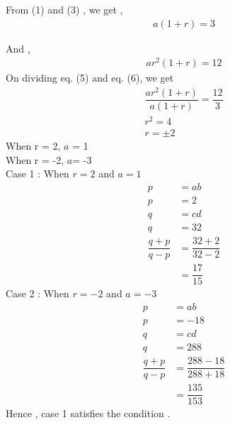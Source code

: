\documentclass[journal,12pt,twocolumn]{IEEEtran}
\theoremstyle{remark}
\begin{document}
From (1) and (3) , we get , 
\begin{align}
a(1+r)=3
\end{align}
 
 And ,
 \begin{align}
ar^{2}(1+r) = 12
\end{align}
On dividing eq. (5) and eq. (6), we get
\begin{align}
\dfrac{ar^{2}(1+r)}{a(1+r)} = \dfrac{12}{3} \\
r^{2} = 4 \\
r = \pm2
\end{align}
When r = 2, $a$ = 1 \\
When r = -2, $a$= -3 \\
Case 1 :
When $r = 2$ and $a = 1$ \\
\begin{align}
p &= ab\\
p&=2 \\
q&= cd \\
q&=32 \\
\dfrac{q+p}{q-p} &= \dfrac{32 + 2}{32 - 2} \\
&=\dfrac{17}{15}
\end{align}
Case 2 :
When $r = -2$ and $a = -3$ \\
\begin{align}
p &= ab\\
p&=-18 \\
q&= cd \\
q&=288 \\
\dfrac{q+p}{q-p} &= \dfrac{288-18}{288+18} \\
&=\dfrac{135}{153}
\end{align}
Hence , case 1 satisfies the condition .
\end{document}
